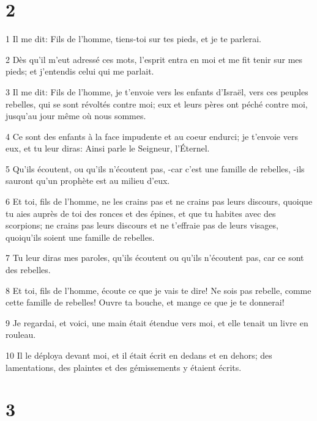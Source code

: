 \chapter{2}

\par 1 Il me dit: Fils de l'homme, tiens-toi sur tes pieds, et je te parlerai.
\par 2 Dès qu'il m'eut adressé ces mots, l'esprit entra en moi et me fit tenir sur mes pieds; et j'entendis celui qui me parlait.
\par 3 Il me dit: Fils de l'homme, je t'envoie vers les enfants d'Israël, vers ces peuples rebelles, qui se sont révoltés contre moi; eux et leurs pères ont péché contre moi, jusqu'au jour même où nous sommes.
\par 4 Ce sont des enfants à la face impudente et au coeur endurci; je t'envoie vers eux, et tu leur diras: Ainsi parle le Seigneur, l'Éternel.
\par 5 Qu'ils écoutent, ou qu'ils n'écoutent pas, -car c'est une famille de rebelles, -ils sauront qu'un prophète est au milieu d'eux.
\par 6 Et toi, fils de l'homme, ne les crains pas et ne crains pas leurs discours, quoique tu aies auprès de toi des ronces et des épines, et que tu habites avec des scorpions; ne crains pas leurs discours et ne t'effraie pas de leurs visages, quoiqu'ils soient une famille de rebelles.
\par 7 Tu leur diras mes paroles, qu'ils écoutent ou qu'ils n'écoutent pas, car ce sont des rebelles.
\par 8 Et toi, fils de l'homme, écoute ce que je vais te dire! Ne sois pas rebelle, comme cette famille de rebelles! Ouvre ta bouche, et mange ce que je te donnerai!
\par 9 Je regardai, et voici, une main était étendue vers moi, et elle tenait un livre en rouleau.
\par 10 Il le déploya devant moi, et il était écrit en dedans et en dehors; des lamentations, des plaintes et des gémissements y étaient écrits.

\chapter{3}

